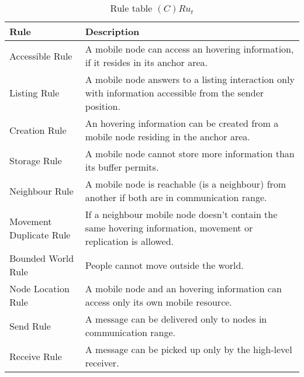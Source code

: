 \begin{table}[H]
	\centering
	\begin{tabular}{|p{4cm}|p{8cm}|}
			\hline
			\textbf{Rule} & \textbf{Description} \\
			\hline
			Accessible Rule & A mobile node can access an hovering information, if it
			resides in its anchor area. \\
			\hline
			Listing Rule & A mobile node answers to a listing interaction only with
			information accessible from the sender position. \\
			\hline
			Creation Rule & An hovering information can be created from a mobile node
			residing in the anchor area. \\
			\hline
			Storage Rule & A mobile node cannot store more information than its
			buffer permits. \\
			\hline
			Neighbour Rule & A mobile node is reachable (is a neighbour) from
			another if both are in communication range. \\
			\hline
			Movement Duplicate Rule & If a neighbour mobile node doesn't contain the same
			hovering information, movement or replication is allowed. \\
			\hline
			Bounded World Rule & People cannot move outside the world. \\
			\hline
			Node Location Rule & A mobile node and an hovering information can access
			only its own mobile resource. \\
			\hline
			Send Rule & A message can be delivered only to nodes in communication range. \\
			\hline
			Receive Rule & A message can be picked up only by the high-level receiver. \\
			\hline
		\end{tabular}
	\caption{Rule table $(C)Ru_t$}
	\label{tab:crut}
\end{table}

